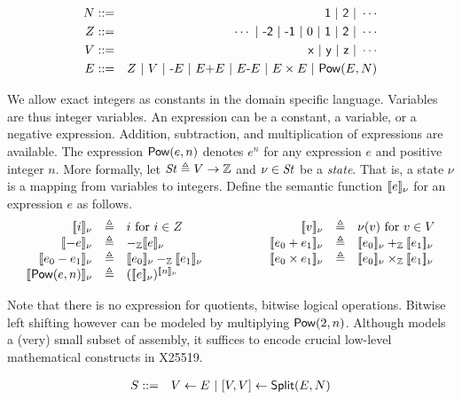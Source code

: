 \begin{eqnarray*}
  N & ::= & \dslcode{1}\ |\ \dslcode{2}\ |\ \cdots\\
  Z & ::= & \cdots \ |\ \dslcode{-2}\ |\ \dslcode{-1} \ |\ 0\ |\ 
            \dslcode{1}\ |\ \dslcode{2}\ |\ \cdots\\
  V & ::= & \dslcode{x} \ |\ \dslcode{y} \ |\ \dslcode{z} \ |\ \cdots\\
  E & ::= &  Z \ |\ V \ |\  \dslcode{-}E \ |\ E \dslcode{+} E 
             \ |\ E \dslcode{-} E
             \ |\ E \times E \ |\ \dslcode{Pow} (E, N)
\end{eqnarray*}

We allow exact integers as constants in the domain specific
language. Variables are thus integer variables. An expression can be a
constant, a variable, or a negative expression. Addition, subtraction,
and multiplication of expressions are available. The expression
$\mbox{\textsf{Pow}}(e, n)$ denotes $e^n$ for any expression $e$ and positive
integer $n$. More formally, let $\mathit{St} \triangleq V \rightarrow
\mathbb{Z}$ and $\nu \in \mathit{St}$ be a \emph{state}. That is,
a {state} $\nu$ is a mapping from variables to integers. Define the
semantic function $[\![{e}]\!]_{\nu}$ for an expression $e$ as follows.
\[
\begin{array}{rclcrcl}
  \valueof{{i}}_{\nu} & \defn & i \textmd{  for ${i} \in Z$} 
  & \hspace{.1\textwidth} &
  \valueof{{v}}_{\nu} & \defn & \nu({v}) 
     \textmd{  for ${v} \in V$}\\
  \valueof{-e}_{\nu} & \defn & -_{\bbfZ}\valueof{e}_{\nu}
  &&
  \valueof{e_0 + e_1}_{\nu} & \defn & 
     \valueof{e_0}_{\nu} +_{\bbfZ} \valueof{e_1}_{\nu} \\
  \valueof{e_0 - e_1}_{\nu} & \defn & 
     \valueof{e_0}_{\nu} -_{\bbfZ} \valueof{e_1}_{\nu}
  &&
  \valueof{e_0 \times e_1}_{\nu} & \defn & 
     \valueof{e_0}_{\nu} \times_{\bbfZ} \valueof{e_1}_{\nu} \\
  \valueof{\dslcode{Pow}(e, n)}_{\nu} & \defn & 
     (\valueof{e}_{\nu})^{\valueof{n}_{\nu}}
\end{array}
\]

Note that there is no expression for quotients, bitwise logical
operations. Bitwise left shifting however can be modeled by
multiplying $\mbox{\textsf{Pow}}(2, n)$. Although \mydsl models a (very) 
small subset of assembly, it suffices to encode crucial low-level
mathematical constructs in X25519.

\begin{eqnarray*}
  S & ::= & V \leftarrow E 
            \ |\  {[}{V}, {V}{]} \leftarrow \mbox{\textsf{Split}} (E, N)\\
\end{eqnarray*}


